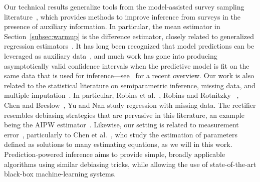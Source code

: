 \documentclass[10pt]{article}
\begin{document}
Our technical results generalize tools from the model-assisted survey sampling literature~\cite[e.g.,][]{sarndal2003model}, which provides methods to improve inference from surveys in the presence of auxiliary information.
In particular, the mean estimator in Section~\ref{subsec:warmup} is the difference estimator, closely related to generalized regression estimators~\cite{cassel1976some}.
It has long been recognized that model predictions can be leveraged as auxiliary data~\cite{wu2001model}, and much work has gone into producing asymptotically valid confidence intervals when the predictive model is fit on the same data that is used for inference---see~\cite{breidt2017model} for a recent overview. Our work is also related to the statistical literature on semiparametric inference, missing data, and multiple imputation~\citep[e.g.,][]{little2019statistical}. In particular, Robins et al.~\cite{robins1994estimation}, Robins and Rotnitzky ~\cite{robins1995semiparametric}, Chen and Breslow~\cite{chen2004semiparametric}, Yu and Nan \cite{yu2006revisit} study regression with missing data.
The rectifier resembles debiasing strategies that are pervasive in this literature, an example being the AIPW estimator~\cite{robins1995semiparametric}.
Likewise, our setting is related to measurement error~\citep[e.g.,][]{carroll2006measurement}, particularly to Chen et al.~\cite{chen2005measurement}, who study the estimation of parameters defined as solutions to many estimating equations, as we will in this work.
Prediction-powered inference aims to provide simple, broadly applicable algorithms using similar debiasing tricks, while allowing the use of state-of-the-art black-box machine-learning systems.
\end{document}
